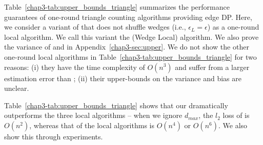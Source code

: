 Table~\ref{chap3-tab:upper_bounds_triangle} summarizes the 
performance guarantees 
of one-round triangle counting algorithms providing edge DP. 
Here, we consider a variant of \AlgWSTri{} that does not shuffle wedges (i.e., $\epsilon_L = \epsilon$) as a one-round local algorithm. 
We call this variant the \AlgWLTri{} (Wedge Local) algorithm. 
We also prove the variance of \AlgARRTri{} \cite{Imola_USENIX22} and \AlgRRTri{} \cite{Imola_USENIX21} 
in Appendix~\ref{chap3-sec:upper}. 
We do not show the other one-round local algorithms \cite{Ye_ICDE20,Ye_TKDE21} in Table~\ref{chap3-tab:upper_bounds_triangle} for two reasons: (i) they have the time complexity of $O(n^3)$ and suffer from a larger estimation error than \AlgRRTri{} \cite{Imola_USENIX22}; 
(ii) their upper-bounds on the variance and bias are unclear. 

Table~\ref{chap3-tab:upper_bounds_triangle} shows that our \AlgWSTriVR{} dramatically outperforms the three local algorithms -- when we ignore $d_{max}$, the $l_2$ loss of \AlgWSTriVR{} is $O(n^2)$, whereas that of the local algorithms is $O(n^4)$ or $O(n^6)$. 
We also show this through experiments. 




